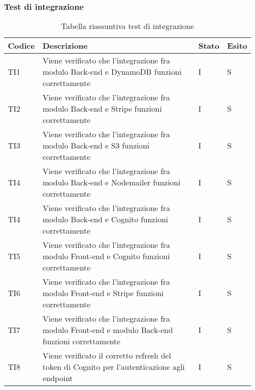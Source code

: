 \subsubsection{Test di integrazione}
{

\centering
\renewcommand{\arraystretch}{2}
\begin{longtable}{C{2cm} C{9.6cm} C{1.5cm} C{1cm}}
\caption{Tabella riassuntiva test di integrazione}\\
\textbf{Codice} &
\textbf{Descrizione}&
\textbf{Stato}&
\textbf{Esito}\\
\endhead


TI1 & Viene verificato che l'integrazione fra modulo Back-end e DynamoDB funzioni correttamente & I & S\\

TI2 & Viene verificato che l'integrazione fra modulo Back-end e Stripe funzioni correttamente & I & S\\

TI3 & Viene verificato che l'integrazione fra modulo Back-end e S3 funzioni correttamente & I & S\\

TI4 & Viene verificato che l'integrazione fra modulo Back-end e Nodemailer funzioni correttamente & I & S\\

TI4 & Viene verificato che l'integrazione fra modulo Back-end e Cognito funzioni correttamente & I & S\\

TI5 & Viene verificato che l'integrazione fra modulo Front-end e Cognito funzioni correttamente & I & S\\

TI6 & Viene verificato che l'integrazione fra modulo Front-end e Stripe funzioni correttamente & I & S\\

TI7 & Viene verificato che l'integrazione fra modulo Front-end e modulo Back-end funzioni correttamente & I & S\\

TI8 & Viene verificato il corretto refresh del token di Cognito per l'autenticazione agli endpoint & I & S\\



\end{longtable}

}


